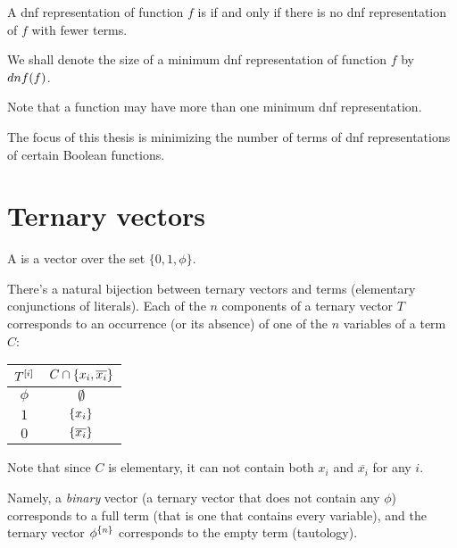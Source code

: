 \begin{definition}
A \acrshort{dnf} representation of function $f$ is
if and only if
there is no \acrshort{dnf} representation of $f$
with fewer terms.

We shall denote the size of
a minimum \acrshort{dnf} representation
of function $f$
by $dnf (f)$.
\end{definition}

Note that a function may have more than one minimum
\acrshort{dnf} representation.

The focus of this thesis is
minimizing the number of terms
of \acrshort{dnf} representations
of certain Boolean functions.

\section{Ternary vectors}

\begin{definition}
A 
is a vector over the set
$\{0, 1, \phi\}$.
\end{definition}

There's a natural bijection between ternary vectors
and terms (elementary conjunctions of literals).
Each of the $n$ components of a ternary vector $T$
corresponds to an occurrence (or its absence)
of one of the $n$ variables of a term $C$:

\begin{center}
\begin{tabular}{cc}
$T^{[i]}$ & $C \cap \{x_i, \overline{x_i}\}$ \\
\hline
$\phi$ & $\emptyset$ \\
$1$ & $\{x_i\}$ \\
$0$ & $\{\overline{x_i}\}$
\end{tabular}
\end{center}

Note that since $C$ is elementary,
it can not contain both $x_i$ and $\overline{x_i}$
for any $i$.

Namely,
a \emph{binary} vector
(a ternary vector that does not contain any $\phi$)
corresponds to a full term
(that is one that contains every variable),
and the ternary vector $\phi^{\{n\}}$
corresponds to the empty term (tautology).


